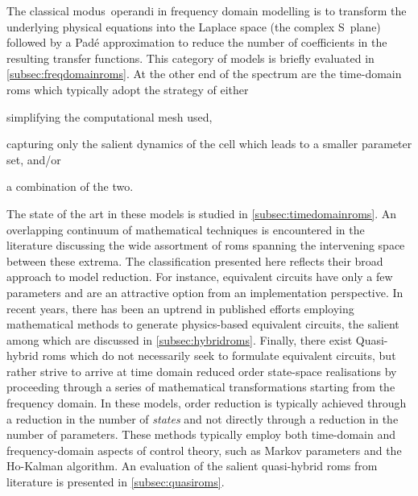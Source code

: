 The classical \mbox{modus operandi} in frequency domain modelling is to
transform the underlying physical equations into the Laplace space (the complex
S~plane) followed by a Padé approximation to reduce the number of coefficients
in the resulting transfer functions. This category of models is briefly
evaluated in \cref{subsec:freqdomainroms}. At the other end of the spectrum are
the time-domain \glspl{rom} which typically adopt the strategy of either
\begin{enumerate*}[label=\itshape\alph*\upshape)]
    \item simplifying the computational mesh used,
    \item capturing only the salient dynamics of the cell which leads to a smaller parameter set,
        and/or
    \item a combination of the two.
\end{enumerate*}
The state of the art in these models is studied in \cref{subsec:timedomainroms}.
An overlapping continuum of mathematical techniques is encountered in the
literature discussing the wide assortment of \glspl{rom} spanning the
intervening space between these extrema. The classification presented here
reflects their broad approach to model reduction. For instance, equivalent
circuits have only a few parameters and are an attractive option from an
implementation perspective. In recent years, there has been an uptrend in
published efforts employing mathematical methods to generate physics-based
equivalent circuits, the salient among which are discussed in
\cref{subsec:hybridroms}. Finally, there exist Quasi-hybrid \glspl{rom} which do
not necessarily seek to formulate equivalent circuits, but rather strive to
arrive at  time domain reduced order state-space realisations by proceeding
through a series of mathematical transformations starting from the frequency
domain. In these models, order reduction is typically achieved through a
reduction in the number of \emph{states} and not directly through a reduction in
the number of parameters. These methods typically  employ both time-domain and
frequency-domain aspects of control theory, such as Markov parameters and the
Ho-Kalman algorithm. An evaluation of the salient quasi-hybrid \glspl{rom} from
literature is presented in \cref{subsec:quasiroms}.


